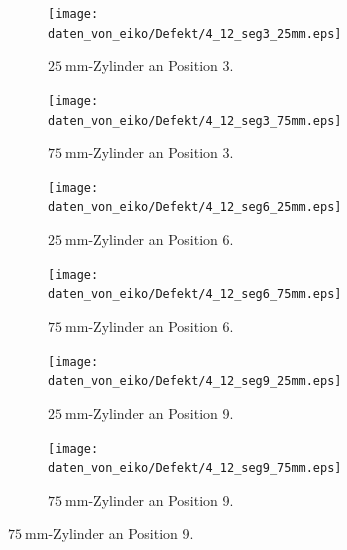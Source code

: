 \begin{figure}
  \centering
  \caption{Plots der Frequenzspektren bei Vertauschung der Zylinder.}
  \label{fig:korrekturtausch}
  \begin{subfigure}{0.49\textwidth}
    \centering
    \texttt{[image: daten\_von\_eiko/Defekt/4\_12\_seg3\_25mm.eps]}
    \caption{$\SI{25}{\milli\meter}$-Zylinder an Position 3.}
  \end{subfigure}
  \begin{subfigure}{0.49\textwidth}
    \centering
    \texttt{[image: daten\_von\_eiko/Defekt/4\_12\_seg3\_75mm.eps]}
    \caption{$\SI{75}{\milli\meter}$-Zylinder an Position 3.}
  \end{subfigure}
  \begin{subfigure}{0.49\textwidth}
    \centering
    \texttt{[image: daten\_von\_eiko/Defekt/4\_12\_seg6\_25mm.eps]}
    \caption{$\SI{25}{\milli\meter}$-Zylinder an Position 6.}
  \end{subfigure}
  \begin{subfigure}{0.49\textwidth}
    \centering
    \texttt{[image: daten\_von\_eiko/Defekt/4\_12\_seg6\_75mm.eps]}
    \caption{$\SI{75}{\milli\meter}$-Zylinder an Position 6.}
  \end{subfigure}
  \begin{subfigure}{0.49\textwidth}
    \centering
    \texttt{[image: daten\_von\_eiko/Defekt/4\_12\_seg9\_25mm.eps]}
    \caption{$\SI{25}{\milli\meter}$-Zylinder an Position 9.}
  \end{subfigure}
  \begin{subfigure}{0.49\textwidth}
    \centering
    \texttt{[image: daten\_von\_eiko/Defekt/4\_12\_seg9\_75mm.eps]}
    \caption{$\SI{75}{\milli\meter}$-Zylinder an Position 9.}
  \end{subfigure}
\end{figure}
